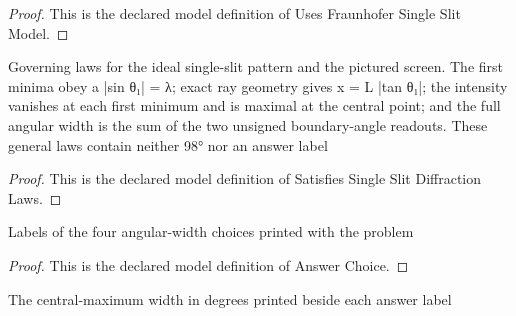 \begin{proof}
  This is the declared model definition of Uses Fraunhofer Single Slit Model.
\end{proof}
\begin{definition}
  \label{def:physics:phyx-mini-0126:phyxminiproblems-problemphyxmini0126-satisfiessingleslitdiffractionlaws}
  Governing laws for the ideal single-slit pattern and the pictured screen. The first minima obey a |sin θ₁| = λ; exact ray geometry gives x = L |tan θ₁|; the intensity vanishes at each first minimum and is maximal at the central point; and the full angular width is the sum of the two unsigned boundary-angle readouts. These general laws contain neither 98° nor an answer label
\end{definition}
\begin{proof}
  This is the declared model definition of Satisfies Single Slit Diffraction Laws.
\end{proof}
\begin{definition}
  \label{def:physics:phyx-mini-0126:phyxminiproblems-problemphyxmini0126-answerchoice}
  Labels of the four angular-width choices printed with the problem
\end{definition}
\begin{proof}
  This is the declared model definition of Answer Choice.
\end{proof}
\begin{definition}
  \label{def:physics:phyx-mini-0126:phyxminiproblems-problemphyxmini0126-displayedangularwidthdegrees}
  The central-maximum width in degrees printed beside each answer label
\end{definition}
